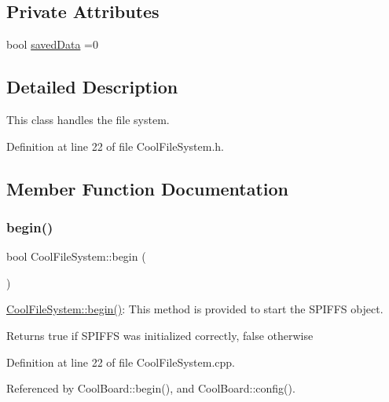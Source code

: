 \subsection*{Private Attributes}
\begin{DoxyCompactItemize}
\item 
bool \hyperlink{classCoolFileSystem_ad398e0c5c41a0c88acdf5d672aa71351}{saved\+Data} =0
\end{DoxyCompactItemize}


\subsection{Detailed Description}
This class handles the file system. 

Definition at line 22 of file Cool\+File\+System.\+h.



\subsection{Member Function Documentation}
\mbox{\label{classCoolFileSystem_a6ba6f666ed4c530174f8569d2c636748}} 
\subsubsection{\texorpdfstring{begin()}{begin()}}
{\footnotesize\ttfamily bool Cool\+File\+System\+::begin (\begin{DoxyParamCaption}{ }\end{DoxyParamCaption})}

\hyperlink{classCoolFileSystem_a6ba6f666ed4c530174f8569d2c636748}{Cool\+File\+System\+::begin()}\+: This method is provided to start the S\+P\+I\+F\+FS object.

\begin{DoxyReturn}{Returns}
true if S\+P\+I\+F\+FS was initialized correctly, false otherwise 
\end{DoxyReturn}


Definition at line 22 of file Cool\+File\+System.\+cpp.



Referenced by Cool\+Board\+::begin(), and Cool\+Board\+::config().


